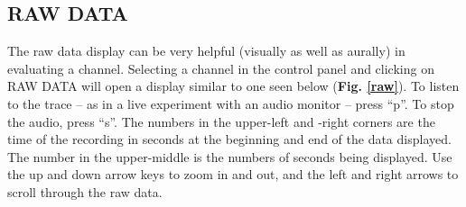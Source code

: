\documentclass[12pt]{article}
\begin{document}
\subsection{\sf RAW DATA}
The raw data display can be very helpful (visually as well as aurally)
in evaluating a channel. Selecting a channel in the control panel and
clicking on {\sf RAW DATA} will open a display similar to one seen
below (\textbf{Fig. \ref{raw}}). To listen to the trace -- as in a
live experiment with an audio monitor -- press ``p''. To stop the
audio, press ``s''.  The numbers in the upper-left and -right corners
are the time of the recording in seconds at the beginning and end of
the data displayed. The number in the upper-middle is the numbers of
seconds being displayed. Use the up and down arrow keys to zoom in and
out, and the left and right arrows to scroll through the raw data.
\begin{center}
  \label{raw}
\end{center}
\end{document}
